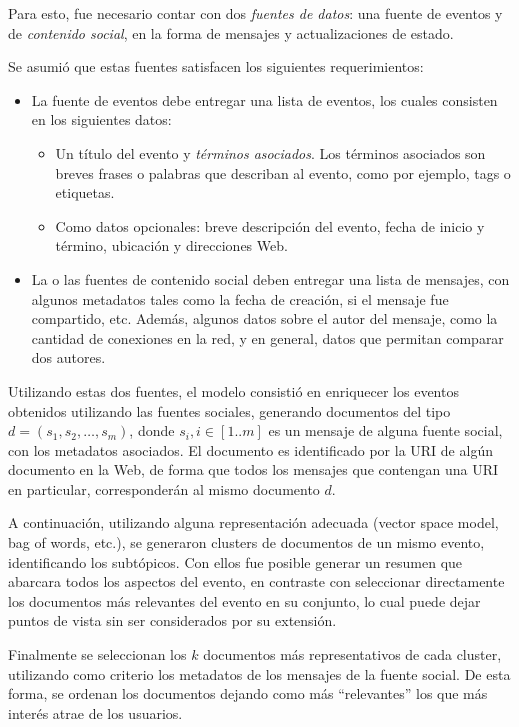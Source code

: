 \documentclass[upright, contnum]{umemoria}
\begin{document}
   Para esto, fue necesario contar con dos \emph{fuentes de datos}: una
   fuente de eventos y de \emph{contenido social}, en la forma de mensajes
   y actualizaciones de estado.

   Se asumió que estas fuentes satisfacen los siguientes
   requerimientos:

\begin{itemize}
\item La fuente de eventos debe entregar una lista de eventos, los
     cuales consisten en los siguientes datos:

\begin{itemize}
\item Un título del evento y \emph{términos asociados}. Los términos
       asociados son breves frases o palabras que describan al
       evento, como por ejemplo, tags o etiquetas.
\item Como datos opcionales: breve descripción del evento, fecha de
       inicio y término, ubicación y direcciones Web.
\end{itemize}

\item La o las fuentes de contenido social deben entregar una lista de
     mensajes, con algunos metadatos tales como la fecha de creación,
     si el mensaje fue compartido, etc. Además, algunos datos sobre el
     autor del mensaje, como la cantidad de conexiones en la red, y
     en general, datos que permitan comparar dos autores.
\end{itemize}
   Utilizando estas dos fuentes, el modelo consistió en enriquecer los
   eventos obtenidos utilizando las fuentes sociales, generando
   documentos del tipo $d = (s_1, s_2, \ldots, s_m)$, donde 
   $s_i, i \in [1..m]$ es un mensaje de alguna fuente social, con los
   metadatos asociados. El documento es identificado por la URI de
   algún documento en la Web, de forma que todos los mensajes que
   contengan una URI en particular, corresponderán al mismo documento
   $d$.

   A continuación, utilizando alguna representación adecuada (vector
   space model, bag of words, etc.), se generaron clusters de documentos
   de un mismo evento, identificando los subtópicos. Con ellos fue
   posible generar un resumen que abarcara todos los aspectos del
   evento, en contraste con seleccionar directamente los documentos
   más relevantes del evento en su conjunto, lo cual puede dejar
   puntos de vista sin ser considerados por su extensión.

   Finalmente se seleccionan los $k$ documentos más representativos de
   cada cluster, utilizando como criterio los metadatos de los
   mensajes de la fuente social. De esta forma, se ordenan los
   documentos dejando como más ``relevantes'' los que más interés atrae
   de los usuarios.
\end{document}
